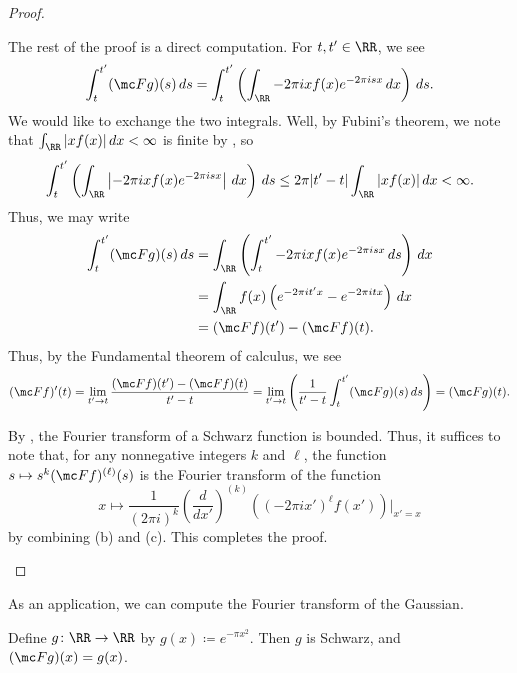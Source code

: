 \documentclass[notes.tex]{subfiles}
\begin{document}
\begin{proof}
\begin{listalph}
		The rest of the proof is a direct computation. For $t,t'\in\RR$, we see
		\[\int_t^{t'}(\mc Fg)(s)\,ds=\int_t^{t'}\left(\int_\RR-2\pi ixf(x)e^{-2\pi isx}\,dx\right)\,ds.\]
		We would like to exchange the two integrals. Well, by Fubini's theorem, we note that $\int_\RR|xf(x)|\,dx<\infty$ is finite by , so
		\[\int_t^{t'}\left(\int_\RR\left|-2\pi ixf(x)e^{-2\pi isx}\right|\,dx\right)\,ds\le2\pi|t'-t|\int_\RR|xf(x)|\,dx<\infty.\]
		Thus, we may write
		\begin{align*}
			\int_t^{t'}(\mc Fg)(s)\,ds &= \int_\RR\left(\int_t^{t'}-2\pi ixf(x)e^{-2\pi isx}\,ds\right)\,dx \\
			&= \int_\RR f(x)\left(e^{-2\pi it'x}-e^{-2\pi itx}\right)\,dx \\
			&= (\mc Ff)(t')-(\mc Ff)(t).
		\end{align*}
		Thus, by the Fundamental theorem of calculus, we see
		\[(\mc Ff)'(t)=\lim_{t'\to t}\frac{(\mc Ff)(t')-(\mc Ff)(t)}{t'-t}=\lim_{t'\to t}\left(\frac1{t'-t}\int_t^{t'}(\mc Fg)(s)\,ds\right)=(\mc Fg)(t).\]

		\item By , the Fourier transform of a Schwarz function is bounded. Thus, it suffices to note that, for any nonnegative integers $k$ and $\ell$, the function $s\mapsto s^k(\mc Ff)^{(\ell)}(s)$ is the Fourier transform of the function
		\[x\mapsto\frac1{(2\pi i)^k}\left(\frac d{dx'}\right)^{(k)}\left((-2\pi ix')^\ell f(x')\right)\bigg|_{x'=x}\]
		by combining (b) and (c). This completes the proof.
		\qedhere
	\end{listalph}
\end{proof}
As an application, we can compute the Fourier transform of the Gaussian.
\begin{exe}[Gaussian] \label{exe:gaussian}
	Define $g\colon\RR\to\RR$ by $g(x)\coloneqq e^{-\pi x^2}$. Then $g$ is Schwarz, and $(\mc Fg)(x)=g(x)$.
\end{exe}
\end{document}
